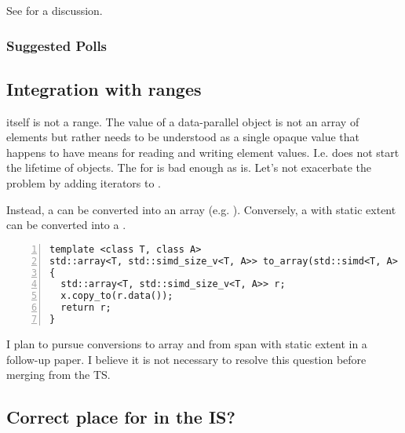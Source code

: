 See  for a discussion.

\subsubsection{Suggested Polls}



\subsection{Integration with ranges}
 itself is not a range.
The value of a data-parallel object is not an array of elements but rather needs to be understood as a single opaque value that happens to have means for reading and writing element values.
I.e.  does not start the lifetime of  objects.
The  for  is bad enough as is.
Let's not exacerbate the problem by adding iterators to .

Instead, a  can be converted into an array (e.g. ).
Conversely, a \std{} with static extent can be converted into a \std{}.
\begin{lstlisting}[numbers=left,float={hbtp},label=lst:simdtoarray,caption={
  \code{simd} to \code{array} conversion
}]
template <class T, class A>
std::array<T, std::simd_size_v<T, A>> to_array(std::simd<T, A> x)
{
  std::array<T, std::simd_size_v<T, A>> r;
  x.copy_to(r.data());
  return r;
}
\end{lstlisting}

I plan to pursue conversions to array and from span with static extent in a follow-up paper.
I believe it is not necessary to resolve this question before merging  from the TS.

\subsection{Correct place for  in the IS?}

